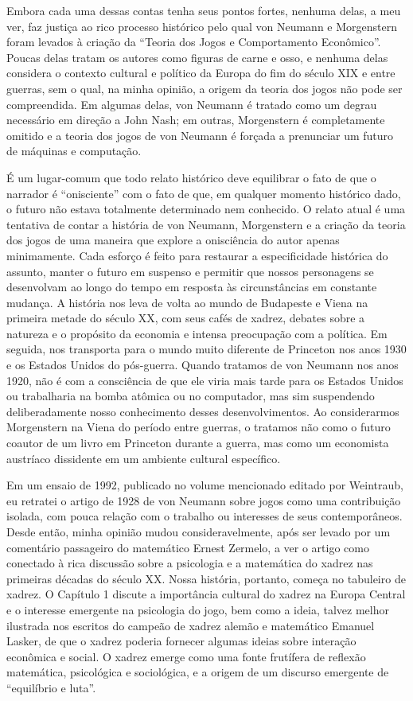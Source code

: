 \documentclass[a4paper,12pt]{article}[abntex2]
\begin{document}
Embora cada uma dessas contas tenha seus pontos fortes, nenhuma delas, a meu ver, faz justiça ao rico processo histórico pelo qual von Neumann e Morgenstern foram levados à criação da “Teoria dos Jogos e Comportamento Econômico”. Poucas delas tratam os autores como figuras de carne e osso, e nenhuma delas considera o contexto cultural e político da Europa do fim do século XIX e entre guerras, sem o qual, na minha opinião, a origem da teoria dos jogos não pode ser compreendida. Em algumas delas, von Neumann é tratado como um degrau necessário em direção a John Nash; em outras, Morgenstern é completamente omitido e a teoria dos jogos de von Neumann é forçada a prenunciar um futuro de máquinas e computação.

É um lugar-comum que todo relato histórico deve equilibrar o fato de que o narrador é “onisciente” com o fato de que, em qualquer momento histórico dado, o futuro não estava totalmente determinado nem conhecido. O relato atual é uma tentativa de contar a história de von Neumann, Morgenstern e a criação da teoria dos jogos de uma maneira que explore a onisciência do autor apenas minimamente. Cada esforço é feito para restaurar a especificidade histórica do assunto, manter o futuro em suspenso e permitir que nossos personagens se desenvolvam ao longo do tempo em resposta às circunstâncias em constante mudança. A história nos leva de volta ao mundo de Budapeste e Viena na primeira metade do século XX, com seus cafés de xadrez, debates sobre a natureza e o propósito da economia e intensa preocupação com a política. Em seguida, nos transporta para o mundo muito diferente de Princeton nos anos 1930 e os Estados Unidos do pós-guerra. Quando tratamos de von Neumann nos anos 1920, não é com a consciência de que ele viria mais tarde para os Estados Unidos ou trabalharia na bomba atômica ou no computador, mas sim suspendendo deliberadamente nosso conhecimento desses desenvolvimentos. Ao considerarmos Morgenstern na Viena do período entre guerras, o tratamos não como o futuro coautor de um livro em Princeton durante a guerra, mas como um economista austríaco dissidente em um ambiente cultural específico.

Em um ensaio de 1992, publicado no volume mencionado editado por Weintraub, eu retratei o artigo de 1928 de von Neumann sobre jogos como uma contribuição isolada, com pouca relação com o trabalho ou interesses de seus contemporâneos. Desde então, minha opinião mudou consideravelmente, após ser levado por um comentário passageiro do matemático Ernest Zermelo, a ver o artigo como conectado à rica discussão sobre a psicologia e a matemática do xadrez nas primeiras décadas do século XX. Nossa história, portanto, começa no tabuleiro de xadrez. O Capítulo 1 discute a importância cultural do xadrez na Europa Central e o interesse emergente na psicologia do jogo, bem como a ideia, talvez melhor ilustrada nos escritos do campeão de xadrez alemão e matemático Emanuel Lasker, de que o xadrez poderia fornecer algumas ideias sobre interação econômica e social. O xadrez emerge como uma fonte frutífera de reflexão matemática, psicológica e sociológica, e a origem de um discurso emergente de “equilíbrio e luta”.
\end{document}
